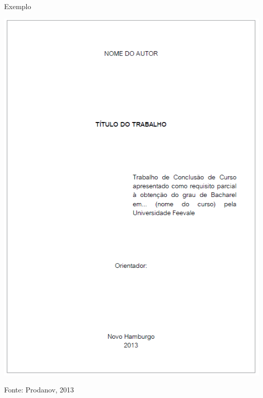 \documentclass{beamer}
\begin{document}
\begin{frame}{Exemplo}
  \begin{center}
    \includegraphics[height=0.8\textheight]{EstruturaII/rosto}
  \end{center}

  \vfill
  Fonte: Prodanov, 2013
\end{frame}

\end{document}

